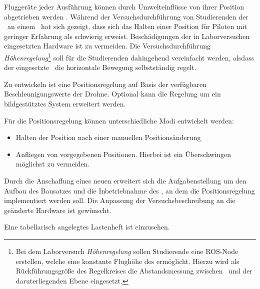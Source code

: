 
Fluggeräte jeder Ausführung können durch Umwelteinflüsse von ihrer Position abgetrieben werden . Während der Versuchsdurchführung von Studierenden der \DHBW\ an einem \Quad\ hat sich gezeigt, dass sich das Halten einer Position für Piloten mit geringer Erfahrung als schwierig erweist. Beschädigungen der in Laborversuchen eingesetzten Hardware ist zu vermeiden.
Die Versuchsdurchführung \textit{Höhenregelung}\footnote{Bei dem Laborversuch \textit{Höhenregelung} sollen Studierende eine ROS-Node erstellen, welche eine konstante Flughöhe des \Quad[s] ermöglicht. Hierzu wird als Rückführungsgröße des Regelkreises die Abstandsmessung zwischen \Quad\ und der daruterliegenden Ebene eingesetzt.} soll für die Studierenden dahingehend vereinfacht werden, alsdass der eingesetzte \Quad\ die horizontale Bewegung selbstständig regelt.

Zu entwickeln ist eine Positionsregelung auf Basis der verfügbaren Beschleunigungswerte der Drohne. Optional kann die Regelung um ein bildgestütztes System erweitert werden.

Für die Positionsregelung können unterschiedliche Modi entwickelt werden:
\begin{itemize}
\item Halten der Position nach einer manuellen Positionsänderung
\item Anfliegen von vorgegebenen Positionen. Hierbei ist ein Überschwingen möglichst zu vermeiden.
\end{itemize}

Durch die Anschaffung eines neuen \Quad[s] erweitert sich die Aufgabenstellung um den Aufbau des Bausatzes und die Inbetriebnahme des \Quad[s], an dem die Positionsregelung implementiert werden soll.
Die Anpassung der Versuchsbeschreibung an die geänderte Hardware ist gewünscht.

Eine tabellarisch angelegtes Lastenheft ist  einzusehen.






